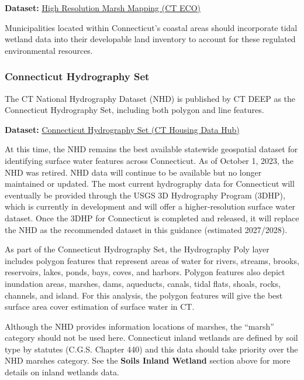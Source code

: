 \documentclass[
  letterpaper,
  DIV=11,
  numbers=noendperiod]{scrreprt}
\begin{document}
\textbf{Dataset:}
\href{https://maps.cteco.uconn.edu/projects/highres_marsh/}{High
Resolution Marsh Mapping (CT ECO)}

\begin{tcolorbox}[enhanced jigsaw, arc=.35mm, bottomrule=.15mm, breakable, colback=white, colframe=quarto-callout-note-color-frame, left=2mm, leftrule=.75mm, opacityback=0, rightrule=.15mm, toprule=.15mm]

Municipalities located within Connecticut's coastal areas should
incorporate tidal wetland data into their developable land inventory to
account for these regulated environmental resources.

\end{tcolorbox}

\subsubsection{Connecticut Hydrography
Set}\label{sec-connecticut-hydrography-set}

The CT National Hydrography Dataset (NHD) is published by CT DEEP as the
Connecticut Hydrography Set, including both polygon and line features.

\textbf{Dataset:}
\href{https://housingmaps.ct.gov/maps/ef85cf0c55394065a8a74ea97fbd7ede/about}{Connecticut
Hydrography Set (CT Housing Data Hub)}

At this time, the NHD remains the best available statewide geospatial
dataset for identifying surface water features across Connecticut. As of
October 1, 2023, the NHD was retired. NHD data will continue to be
available but no longer maintained or updated. The most current
hydrography data for Connecticut will eventually be provided through the
USGS 3D Hydrography Program (3DHP), which is currently in development
and will offer a higher‑resolution surface water dataset. Once the 3DHP
for Connecticut is completed and released, it will replace the NHD as
the recommended dataset in this guidance (estimated 2027/2028).

As part of the Connecticut Hydrography Set, the Hydrography Poly layer
includes polygon features that represent areas of water for rivers,
streams, brooks, reservoirs, lakes, ponds, bays, coves, and harbors.
Polygon features also depict inundation areas, marshes, dams, aqueducts,
canals, tidal flats, shoals, rocks, channels, and island. For this
analysis, the polygon features will give the best surface area cover
estimation of surface water in CT.

\begin{tcolorbox}[enhanced jigsaw, arc=.35mm, bottomrule=.15mm, breakable, colback=white, colframe=quarto-callout-note-color-frame, left=2mm, leftrule=.75mm, opacityback=0, rightrule=.15mm, toprule=.15mm]

Although the NHD provides information locations of marshes, the
``marsh'' category should not be used here. Connecticut inland wetlands
are defined by soil type by statutes (C.G.S. Chapter 440) and this data
should take priority over the NHD marshes category. See the
\textbf{Soils Inland Wetland} section above for more details on inland
wetlands data.

\end{tcolorbox}
\end{document}
